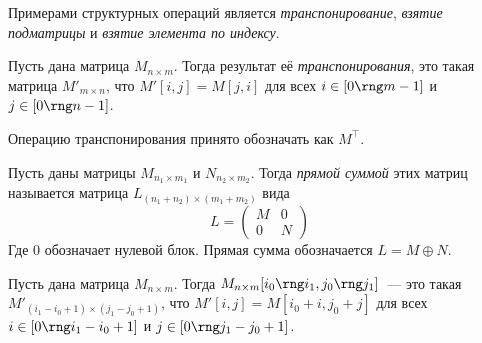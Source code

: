 Примерами структурных операций является \emph{транспонирование}, \emph{взятие подматрицы} и \emph{взятие элемента по индексу}.

\begin{definition}
    Пусть дана матрица $M_{n \times m}$.
    Тогда результат её \emph{транспонирования}, это такая матрица $M'_{m \times n}$, что $M'[i,j] = M[j,i]$ для всех $i \in [0 \rng m - 1]$ и $j \in [0 \rng n - 1]$.

    Операцию транспонирования принято обозначать как $M^\top$.
\end{definition}

\begin{definition}
    Пусть даны матрицы $M_{n_1 \times m_1}$ и $N_{n_2 \times m_2}$.
    Тогда \emph{прямой суммой} этих матриц называется матрица $L_{(n_1 + n_2) \times (m_1 + m_2)}$ вида
    \[
        L =
        \begin{pmatrix}
            M & 0 \\
            0 & N
        \end{pmatrix}
    \]
    Где 0 обозначает нулевой блок. Прямая сумма обозначается $L = M \oplus N$.
\end{definition}

\begin{definition}
    Пусть дана матрица $M_{n\times m}$.
    Тогда $M_{n \times m}[i_0 \rng i_1, j_0 \rng j_1]$~--- это такая $M'_{(i_1 - i_0 + 1) \times (j_1 - j_0 + 1)}$, что $M'[i, j] = M[i_0 + i, j_0 + j]$ для всех $i \in [0 \rng i_1 - i_0 + 1]$ и $j \in [0 \rng j_1 - j_0 + 1]$.
\end{definition}

